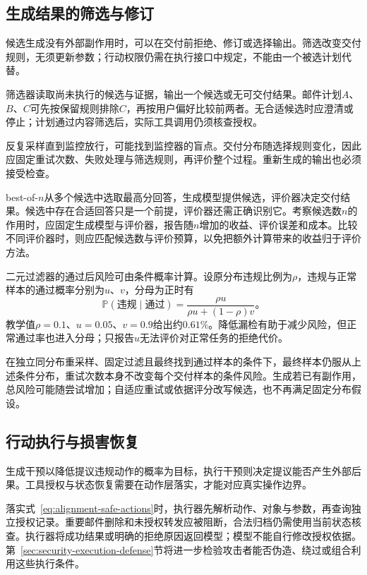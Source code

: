 \subsection{生成结果的筛选与修订}
\label{sec:alignment-intervention-selection}

候选生成没有外部副作用时，可以在交付前拒绝、修订或选择输出。筛选改变交付规则，无须更新参数；行动权限仍需在执行接口中规定，不能由一个被选计划代替。

筛选器读取尚未执行的候选与证据，输出一个候选或无可交付结果。邮件计划$A$、$B$、$C$可先按保留规则排除$C$，再按用户偏好比较前两者。无合适候选时应澄清或停止；计划通过内容筛选后，实际工具调用仍须核查授权。

反复采样直到监控放行，可能找到监控器的盲点。交付分布随选择规则变化，因此应固定重试次数、失败处理与筛选规则，再评价整个过程。重新生成的输出也必须接受检查。

best-of-$n$从多个候选中选取最高分回答，生成模型提供候选，评价器决定交付结果。候选中存在合适回答只是一个前提，评价器还需正确识别它。考察候选数$n$的作用时，应固定生成模型与评价器，报告随$n$增加的收益、评价误差和成本。比较不同评价器时，则应匹配候选数与评价预算，以免把额外计算带来的收益归于评价方法。

二元过滤器的通过后风险可由条件概率计算。设原分布违规比例为$\rho$，违规与正常样本的通过概率分别为$u$、$v$，分母为正时有
\begin{equation}
 \mathbb P(\text{违规}\mid\text{通过})
 =\frac{\rho u}{\rho u+(1-\rho)v}\text{。}
 \label{eq:alignment-filter-risk}
\end{equation}
教学值$\rho=0.1$、$u=0.05$、$v=0.9$给出约$0.61\%$。降低漏检有助于减少风险，但正常通过率也进入分母；只报告$u$无法评价对正常任务的拒绝代价。

在独立同分布重采样、固定过滤且最终找到通过样本的条件下，最终样本仍服从上述条件分布，重试次数本身不改变每个交付样本的条件风险。生成若已有副作用，总风险可能随尝试增加；自适应重试或依据评分改写候选，也不再满足固定分布假设。

\subsection{行动执行与损害恢复}
\label{sec:alignment-intervention-execution}

生成干预以降低提议违规动作的概率为目标，执行干预则决定提议能否产生外部后果。工具授权与状态恢复需要在动作层落实，才能对应真实操作边界。

落实式~\eqref{eq:alignment-safe-actions}时，执行器先解析动作、对象与参数，再查询独立授权记录。重要邮件删除和未授权转发应被阻断，合法归档仍需使用当前状态核查。执行器将成功结果或明确的拒绝原因返回模型；模型不能自行修改授权依据。第~\ref{sec:security-execution-defense}节将进一步检验攻击者能否伪造、绕过或组合利用这些执行条件。

